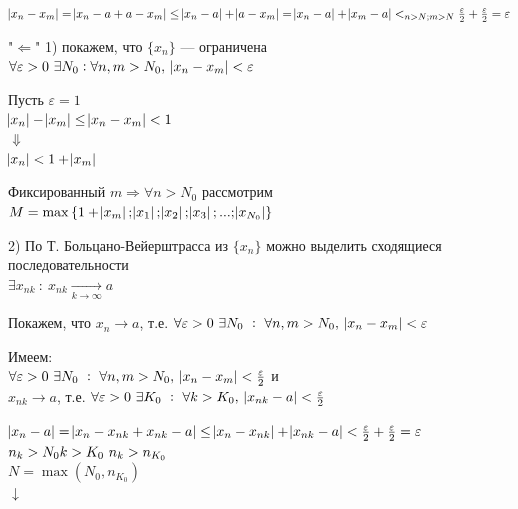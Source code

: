 \documentclass{article}
\begin{document}
    \( \abs{x_n - x_m} = \abs{x_n - a + a - x_m} \leq \abs{x_n - a} + \abs{a - x_m} = \abs{x_n - a} + \abs{x_m - a} <_{n > N; m > N} \frac{\varepsilon}{2} + \frac{\varepsilon}{2} = \varepsilon \)

    "\(\Leftarrow\)" 1) покажем, что \(\{x_n\}\) --- ограничена \(\forall \varepsilon > 0\ \exists N_0 : \forall n,m > N_0,\ \abs{x_n - x_m} < \varepsilon\)
    
    Пусть \(\varepsilon = 1\)
    \\\(\abs{x_n} - \abs{x_m} \leq \abs{x_n - x_m} < 1\)
    \\\( \Downarrow \)
    \\\( \abs{x_n} < 1 + \abs{x_m} \)

    Фиксированный \( m \Rightarrow \forall n > N_0 \) рассмотрим \( M = \max{\{ 1 + \abs{x_m}; \abs{x_1}; \abs{x_2}; \abs{x_3}; ... ; \abs{x_{N_0}} \}} \)
    
    2) По Т. Больцано-Вейерштрасса из \(\{x_n\}\) можно выделить сходящиеся последовательности
    \\\(\exists x_{nk}\ :\ x_{nk} \xrightarrow[k \rightarrow \infty]{} a \)
    
	Покажем, что \( x_n \rightarrow a \), т.е. \(\forall \varepsilon > 0\ \exists N_0\ :\ \forall n, m > N_0,\ \abs{x_n - x_m} < \varepsilon \)

    Имеем:\\
    \(\forall \varepsilon > 0\ \exists N_0\ :\ \forall n, m > N_0,\ \abs{x_n - x_m} < \frac{\varepsilon}{2}\) и\\
    \(x_{nk} \rightarrow a\), т.е. \(\forall \varepsilon > 0\ \exists K_0\ :\ \forall k > K_0,\ \abs{x_{nk} - a} < \frac{\varepsilon}{2}\)

    \(\abs{x_n - a} = \abs{x_n - x_{nk} + x_{nk} - a} \leq \abs{x_n - x_{nk}} + \abs{x_{nk} - a} < \frac{\varepsilon}{2} + \frac{\varepsilon}{2} = \varepsilon\)
    \\ \(n_k > N_0\\ k > K_0\ n_k > n_{K_0}\)
    \\\(N = \max(N_0, n_{K_0})\)
    \\\(\downarrow\)
    
\end{document}
